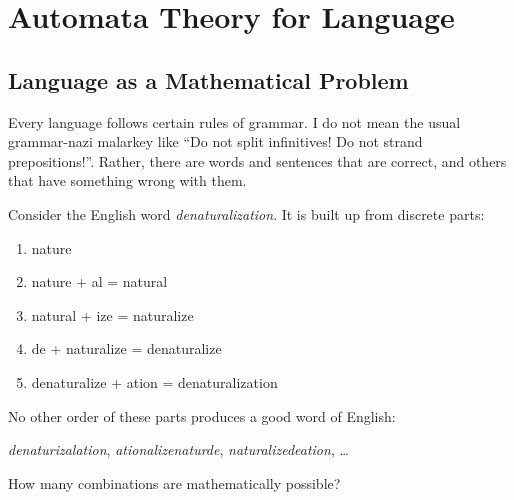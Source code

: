 \chapter*{\texorpdfstring{\color{brown!95}Automata Theory for Language}{Automata Theory for Language}}
\label{cha:fsa}


\section{Language as a Mathematical Problem}

Every language follows certain rules of grammar.
I do not mean the usual grammar-nazi malarkey like ``Do not split infinitives! Do not strand prepositions!''.
Rather, there are words and sentences that are correct, and others that have something wrong with them.

\begin{examplebox}
    Consider the English word \emph{denaturalization}.
    It is built up from discrete parts:
    \begin{enumerate}
        \item nature
        \item nature + al = natural
        \item natural + ize = naturalize
        \item de + naturalize = denaturalize
        \item denaturalize + ation = denaturalization
    \end{enumerate}
    No other order of these parts produces a good word of English:
    
    \smallskip
    \noindent
    \emph{denaturizalation}, \emph{ationalizenaturde}, \emph{naturalizedeation}, \ldots
\end{examplebox}
%
\begin{homework}
    How many combinations are mathematically possible?
\end{homework}

